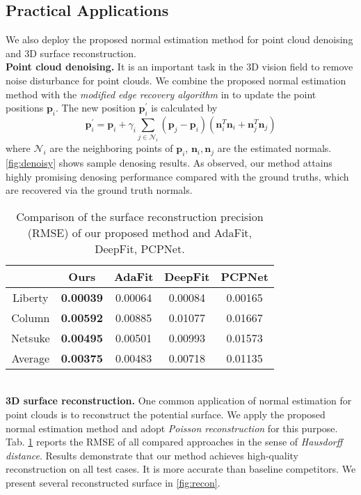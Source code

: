\documentclass[runningheads]{llncs}
\begin{document}
\subsection{Practical Applications}
We also deploy the proposed normal estimation method for point cloud denoising and 3D surface reconstruction. 
\\
\noindent\textbf{Point cloud denoising.} It is an important task in the 3D vision field to remove noise disturbance for point clouds. We combine the proposed normal estimation method with the \emph{modified edge recovery algorithm} in \cite{lu2020low} to update the point positions $\mathbf{p}_i$. The new position $\mathbf{p}_{i}^{\prime}$ is 
calculated by
\begin{equation}
\mathbf{p}_{i}^{\prime}=\mathbf{p}_{i}+\gamma_{i} \sum_{j \in \mathcal{N}_i}\left(\mathbf{p}_{j}-\mathbf{p}_{i}\right)\left(\mathbf{n}_{i}^{T} \mathbf{n}_{i} + \mathbf{n}_{j}^{T} \mathbf{n}_{j}\right)
\end{equation}
where $\mathcal{N}_i$ are the neighboring points of $\mathbf{p}_i$, $\mathbf{n}_i, \mathbf{n}_j$ are the estimated normals. \cref{fig:denoisy} shows sample denosing results. As observed, our method attains highly promising denosing performance compared with the ground truths, which are recovered via the ground truth normals.
\begin{table}[t]
	\centering
	\caption{Comparison of the 
		surface reconstruction precision (RMSE) of our proposed method and AdaFit, DeepFit, PCPNet.}
	\begin{tabular}{@{}ccccc@{}}
		\toprule
		& Ours             & AdaFit  & DeepFit & PCPNet  \\ \midrule
		Liberty & \textbf{0.00039} & 0.00064 & 0.00084 & 0.00165 \\
		Column  & \textbf{0.00592} & 0.00885 & 0.01077 & 0.01667 \\
		Netsuke & \textbf{0.00495} & 0.00501 & 0.00993 & 0.01573 \\
		Average & \textbf{0.00375} & 0.00483 & 0.00718 & 0.01135 \\ \bottomrule
	\end{tabular}
	\label{tab:recon}
\end{table}
\\
\noindent\textbf{3D surface reconstruction.} One common application of normal estimation for point clouds is to reconstruct the potential surface. We apply the proposed normal estimation method and adopt \emph{Poisson reconstruction} \cite{kazhdan2006poisson} for this purpose. Tab. \ref{tab:recon} reports the RMSE of all compared approaches in the sense of \emph{Hausdorff distance}. Results demonstrate that our method achieves high-quality reconstruction on all test cases. It is more accurate than baseline competitors. We present several reconstructed surface in \cref{fig:recon}.
\end{document}
